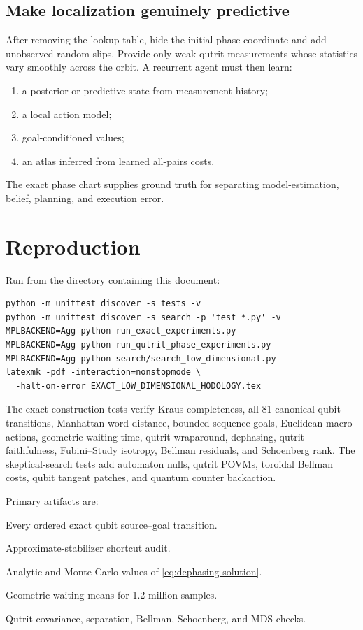 \documentclass[11pt]{article}
\theoremstyle{definition}
\theoremstyle{remark}
\begin{document}
\subsection{Make localization genuinely predictive}

After removing the lookup table, hide the initial phase coordinate and add
unobserved random slips. Provide only weak qutrit measurements whose
statistics vary smoothly across the orbit. A recurrent agent must then learn:
\begin{enumerate}
 \item a posterior or predictive state from measurement history;
 \item a local action model;
 \item goal-conditioned values;
 \item an atlas inferred from learned all-pairs costs.
\end{enumerate}
The exact phase chart supplies ground truth for separating model-estimation,
belief, planning, and execution error.

\section{Reproduction}
\label{sec:reproduction}

Run from the directory containing this document:
\begin{verbatim}
python -m unittest discover -s tests -v
python -m unittest discover -s search -p 'test_*.py' -v
MPLBACKEND=Agg python run_exact_experiments.py
MPLBACKEND=Agg python run_qutrit_phase_experiments.py
MPLBACKEND=Agg python search/search_low_dimensional.py
latexmk -pdf -interaction=nonstopmode \
  -halt-on-error EXACT_LOW_DIMENSIONAL_HODOLOGY.tex
\end{verbatim}

The exact-construction tests verify Kraus completeness, all 81 canonical qubit
transitions, Manhattan word distance, bounded sequence goals, Euclidean
macro-actions, geometric waiting time, qutrit wraparound, dephasing, qutrit
faithfulness, Fubini--Study isotropy, Bellman residuals, and Schoenberg rank.
The skeptical-search tests add automaton nulls, qutrit POVMs, toroidal Bellman
costs, qubit tangent patches, and quantum counter backaction.

Primary artifacts are:
\begin{description}[style=nextline]
 \item[\texttt{results/all\_pairs.csv}]
 Every ordered exact qubit source--goal transition.
 \item[\texttt{results/finite\_tolerance.csv}]
 Approximate-stabilizer shortcut audit.
 \item[\texttt{results/dephasing\_validation.csv}]
 Analytic and Monte Carlo values of \cref{eq:dephasing-solution}.
 \item[\texttt{results/euclidean\_waiting\_validation.csv}]
 Geometric waiting means for 1.2 million samples.
 \item[\texttt{results/qutrit-phase/summary.json}]
 Qutrit covariance, separation, Bellman, Schoenberg, and MDS checks.
\end{description}
\end{document}

